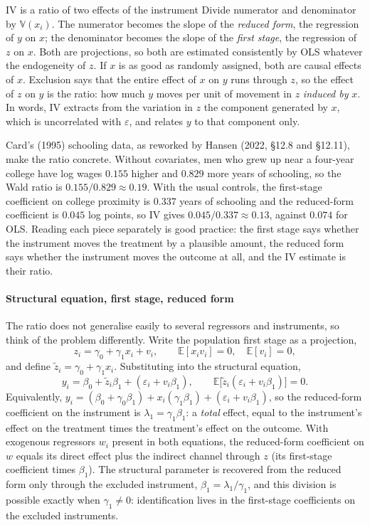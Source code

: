 \documentclass[11pt,a4paper]{article}
\newcommand{\E}{\mathbb{E}}
\newcommand{\V}{\mathbb{V}}
\begin{document}
\begin{whybox}{IV is a ratio of two effects of the instrument}
Divide numerator and denominator by $\V(x_i)$. The numerator becomes the slope of the \emph{reduced form}, the regression of $y$ on $x$; the denominator becomes the slope of the \emph{first stage}, the regression of $z$ on $x$. Both are projections, so both are estimated consistently by OLS whatever the endogeneity of $z$. If $x$ is as good as randomly assigned, both are causal effects of $x$. Exclusion says that the entire effect of $x$ on $y$ runs through $z$, so the effect of $z$ on $y$ is the ratio: how much $y$ moves per unit of movement in $z$ \emph{induced by} $x$. In words, IV extracts from the variation in $z$ the component generated by $x$, which is uncorrelated with $\varepsilon$, and relates $y$ to that component only.

Card's (1995) schooling data, as reworked by Hansen (2022, \S12.8 and \S12.11), make the ratio concrete. Without covariates, men who grew up near a four-year college have log wages $0.155$ higher and $0.829$ more years of schooling, so the Wald ratio is $0.155/0.829\approx0.19$. With the usual controls, the first-stage coefficient on college proximity is $0.337$ years of schooling and the reduced-form coefficient is $0.045$ log points, so IV gives $0.045/0.337\approx0.13$, against $0.074$ for OLS. Reading each piece separately is good practice: the first stage says whether the instrument moves the treatment by a plausible amount, the reduced form says whether the instrument moves the outcome at all, and the IV estimate is their ratio.
\end{whybox}

\paragraph{Structural equation, first stage, reduced form}
The ratio does not generalise easily to several regressors and instruments, so think of the problem differently. Write the population first stage as a projection,
\[
z_i=\gamma_0+\gamma_1x_i+v_i,\qquad\E[x_iv_i]=0,\quad\E[v_i]=0,
\]
and define $\tilde z_i=\gamma_0+\gamma_1x_i$. Substituting into the structural equation,
\[
y_i=\beta_0+\tilde z_i\beta_1+(\varepsilon_i+v_i\beta_1),\qquad\E\big[\tilde z_i(\varepsilon_i+v_i\beta_1)\big]=0 .
\]
Equivalently, $y_i=(\beta_0+\gamma_0\beta_1)+x_i(\gamma_1\beta_1)+(\varepsilon_i+v_i\beta_1)$, so the reduced-form coefficient on the instrument is $\lambda_1=\gamma_1\beta_1$: a \emph{total} effect, equal to the instrument's effect on the treatment times the treatment's effect on the outcome. With exogenous regressors $w_i$ present in both equations, the reduced-form coefficient on $w$ equals its direct effect plus the indirect channel through $z$ (its first-stage coefficient times $\beta_1$). The structural parameter is recovered from the reduced form only through the excluded instrument, $\beta_1=\lambda_1/\gamma_1$, and this division is possible exactly when $\gamma_1\neq0$: identification lives in the first-stage coefficients on the excluded instruments.
\end{document}
